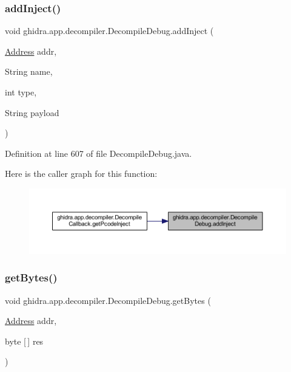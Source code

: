 \subsubsection{\texorpdfstring{addInject()}{addInject()}}
{\footnotesize\ttfamily void ghidra.\+app.\+decompiler.\+Decompile\+Debug.\+add\+Inject (\begin{DoxyParamCaption}\item[{\mbox{\hyperlink{class_address}{Address}}}]{addr,  }\item[{String}]{name,  }\item[{int}]{type,  }\item[{String}]{payload }\end{DoxyParamCaption})\hspace{0.3cm}{\ttfamily [inline]}}



Definition at line 607 of file Decompile\+Debug.\+java.

Here is the caller graph for this function\+:
\nopagebreak
\begin{figure}[H]
\begin{center}
\leavevmode
\includegraphics[width=350pt]{classghidra_1_1app_1_1decompiler_1_1_decompile_debug_a7163633c8aa4444a1fc36fff80482428_icgraph}
\end{center}
\end{figure}
\mbox{\label{classghidra_1_1app_1_1decompiler_1_1_decompile_debug_abbbb57329ae69cd3bf3dee407fa190e9}} 
\subsubsection{\texorpdfstring{getBytes()}{getBytes()}}
{\footnotesize\ttfamily void ghidra.\+app.\+decompiler.\+Decompile\+Debug.\+get\+Bytes (\begin{DoxyParamCaption}\item[{\mbox{\hyperlink{class_address}{Address}}}]{addr,  }\item[{byte \mbox{[}$\,$\mbox{]}}]{res }\end{DoxyParamCaption})\hspace{0.3cm}{\ttfamily [inline]}}



